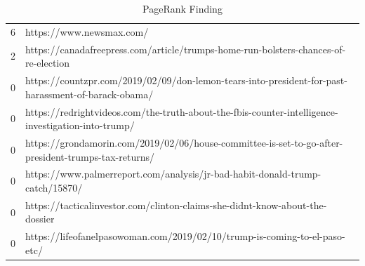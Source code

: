 \documentclass[11pt]{article}
\begin{document}
\begin{table}[h!]
\begin{tabular}{ll}
			6  & https://www.newsmax.com/                                                                                                              \\
			2  & https://canadafreepress.com/article/trumps-home-run-bolsters-chances-of-re-election                                                   \\
			0  & https://countzpr.com/2019/02/09/don-lemon-tears-into-president-for-past-harassment-of-barack-obama/                                   \\
			0  & https://redrightvideos.com/the-truth-about-the-fbis-counter-intelligence-investigation-into-trump/                                    \\
			0  & https://grondamorin.com/2019/02/06/house-committee-is-set-to-go-after-president-trumps-tax-returns/                                   \\
			0  & https://www.palmerreport.com/analysis/jr-bad-habit-donald-trump-catch/15870/                                                          \\
			0  & https://tacticalinvestor.com/clinton-claims-she-didnt-know-about-the-dossier                                                          \\
			0  & https://lifeofanelpasowoman.com/2019/02/10/trump-is-coming-to-el-paso-etc/                                                           
		\end{tabular}
		\caption{PageRank Finding}
		\label{my-label}
	\end{table}
	\newpage
\end{document}
